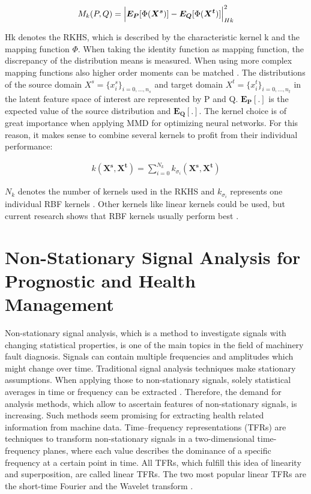 \begin{align}
    M_{k}(P,Q) = \Bigl|  \boldsymbol{E_{P}}[\Phi(\boldsymbol{X^{s}})] - \boldsymbol{E_{Q}}[\Phi(\boldsymbol{X^{t}})]     \Bigl|^{2}_{Hk}
\end{align}

Hk denotes the RKHS, which is described by the characteristic kernel k and the mapping function $\Phi$. When taking the identity function as mapping function, the discrepancy of the distribution means is measured. When using more complex mapping functions also higher order moments can be matched \cite{Yujia2015}. The distributions of the source domain $X^{s} = \{{x}_{i}^{s}\}_{i=0,...,n_{s}}$ and target domain $X^{t} = \{{x}_{i}^{t}\}_{i=0,...,n_{t}}$ in the latent feature space of interest are represented by P and Q. $\boldsymbol{E_{P}[.]}$ is the expected value of the source distribution and $\boldsymbol{E_{Q}[.]}$. The kernel choice is of great importance when applying MMD for optimizing neural networks. For this reason, it makes sense to combine several kernels to profit from their individual performance:

\begin{align}
    k(\boldsymbol{X^{s}}, \boldsymbol{X^{t}}) = \sum_{i=0}^{N_{k}} k_{\sigma_{i}}(\boldsymbol{X^{s}}, \boldsymbol{X^{t}})
\end{align}

$N_{k}$ denotes the number of kernels used in the RKHS and $k_{\sigma_{i}}$ represents one individual RBF kernels  \cite{li2020}. Other kernels like linear kernels could be used, but current research shows that RBF kernels usually perform best \cite{AZAMFAR2020103932}.


\section{Non-Stationary Signal Analysis for Prognostic and Health Management}
Non-stationary signal analysis, which is a method to investigate signals with changing statistical properties, is one of the main topics in the field of machinery fault diagnosis. Signals can contain multiple frequencies and amplitudes which might change over time. Traditional signal analysis techniques make stationary assumptions. When applying those to non-stationary signals, solely statistical averages in time or frequency can be extracted \cite{FENG2013}. Therefore, the demand for analysis methods, which allow to ascertain features of non-stationary signals, is increasing. Such methods seem promising for extracting health related information from machine data. Time–frequency representations (TFRs) are techniques to transform non-stationary signals in a two-dimensional time-frequency planes, where each value describes the dominance of a specific frequency at a certain point in time. All TFRs, which fulfill this idea of linearity and superposition, are called linear TFRs. The two most popular linear TFRs are the short-time Fourier and the Wavelet transform \cite{Hlawatsch1992}. 


